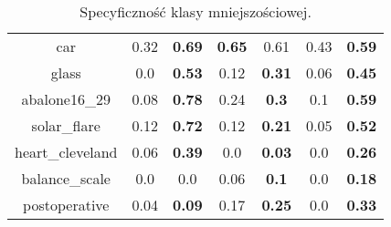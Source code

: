 \begin{table}[H]
\begin{center}
{\begin{tabular}{c|cccccc}
				car&0.32&\textbf{0.69}&\textbf{0.65}&0.61&0.43&\textbf{0.59}\\%
				glass&0.0&\textbf{0.53}&0.12&\textbf{0.31}&0.06&\textbf{0.45}\\%
				abalone16\_29&0.08&\textbf{0.78}&0.24&\textbf{0.3}&0.1&\textbf{0.59}\\%
				solar\_flare&0.12&\textbf{0.72}&0.12&\textbf{0.21}&0.05&\textbf{0.52}\\%
				heart\_cleveland&0.06&\textbf{0.39}&0.0&\textbf{0.03}&0.0&\textbf{0.26}\\%
				balance\_scale&0.0&0.0&0.06&\textbf{0.1}&0.0&\textbf{0.18}\\%
				postoperative&0.04&\textbf{0.09}&0.17&\textbf{0.25}&0.0&\textbf{0.33}\\%
			\end{tabular}}
			\caption{Specyficzność klasy mniejszościowej.}
			\label{specsmoteen}
		\end{center}
	\end{table}
